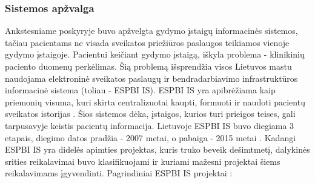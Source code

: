 \subsubsection{Sistemos apžvalga}
Ankstesniame poskyryje buvo apžvelgta gydymo įstaigų informacinės sistemos, tačiau pacientams ne visada sveikatos priežiūros paslaugos teikiamos vienoje gydymo įstaigoje. Pacientui keičiant gydymo įstaigą, iškyla problema - klinikinių paciento duomenų perkėlimas. Šią problemą išsprendžia visos Lietuvos mastu naudojama elektroninė sveikatos paslaugų ir bendradarbiavimo infrastruktūros informacinė sistema (toliau - ESPBI IS). ESPBI IS yra apibrėžiama kaip priemonių visuma, kuri skirta centralizuotai kaupti, formuoti ir naudoti pacientų sveikatos istorijas \cite{ESPBINuostatos}. Šios sistemos dėka, įstaigos, kurios turi prieigos teises, gali tarpusavyje keistis pacientų informacija. Lietuvoje ESPBI IS buvo diegiama 3 etapais, diegimo datos pradžia - 2007 metai, o pabaiga - 2015 metai \cite{Ministras2015}. Kadangi ESPBI IS yra didelės apimties projektas, kuris truko beveik dešimtmetį, dalykinės srities reikalavimai buvo klasifikuojami ir kuriami mažesni projektai šiems reikalavimams įgyvendinti. Pagrindiniai ESPBI IS projektai \cite{Specifikacija}:
